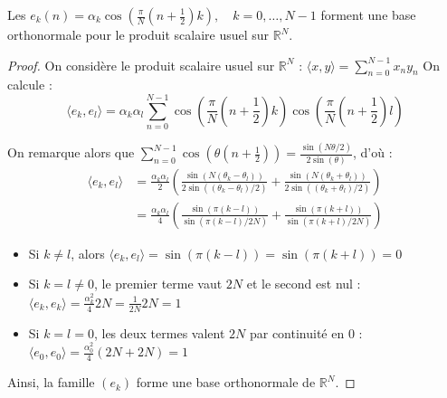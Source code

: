 \label{demo3}
Les $ e_k(n) = \alpha_k \cos\left(\frac{\pi}{N}\left(n+\frac{1}{2}\right)k\right),\quad k=0,\dots,N-1 $ forment une base orthonormale pour le produit scalaire usuel sur $\mathbb{R}^N$.
\begin{proof}
    On considère le produit scalaire usuel sur $\mathbb{R}^N$ :
    $ \langle x,y\rangle = \sum_{n=0}^{N-1} x_ny_n $
    On calcule :
    $$
        \langle e_k,e_l\rangle = \alpha_k \alpha_l \sum_{n=0}^{N-1} \cos\left(\frac{\pi}{N}\left(n+\frac{1}{2}\right)k\right) \cos\left(\frac{\pi}{N}\left(n+\frac{1}{2}\right)l\right)
    $$

        On remarque alors que $\sum_{n=0}^{N-1} \cos\left(\theta\left(n + \frac{1}{2}\right)\right) = \frac{\sin(N\theta/2)}{2\sin(\theta)}$, d'où :
    \begin{align*}
        \langle e_k,e_l\rangle
        &= \frac{\alpha_k \alpha_l}{2} \left( \frac{\sin(N(\theta_k - \theta_l))}{2\sin((\theta_k - \theta_l)/2)} + \frac{\sin(N(\theta_k + \theta_l))}{2\sin((\theta_k + \theta_l)/2)} \right) \\
        &= \frac{\alpha_k \alpha_l}{4} \left( \frac{\sin(\pi(k-l))}{\sin(\pi(k-l)/2N)} + \frac{\sin(\pi(k+l))}{\sin(\pi(k+l)/2N)} \right)
    \end{align*}
\begin{itemize}
    \item Si $k \neq l$, alors $\langle e_k,e_l\rangle = \sin(\pi(k-l)) = \sin(\pi(k+l)) = 0$
    \item Si $k=l \neq 0$, le premier terme vaut $2N$ et le second est nul :
    $\langle e_k,e_k\rangle = \frac{\alpha_k^2}{4} 2N = \frac{1}{2N}2N= 1$
    \item Si $k=l=0$, les deux termes valent $2N$ par continuité en 0 :
    $\langle e_0,e_0\rangle = \frac{\alpha_0^2}{4} (2N + 2N) = 1$
\end{itemize}

    Ainsi, la famille $(e_k)$ forme une base orthonormale de $\mathbb{R}^N$.
\end{proof}

\pagebreak

